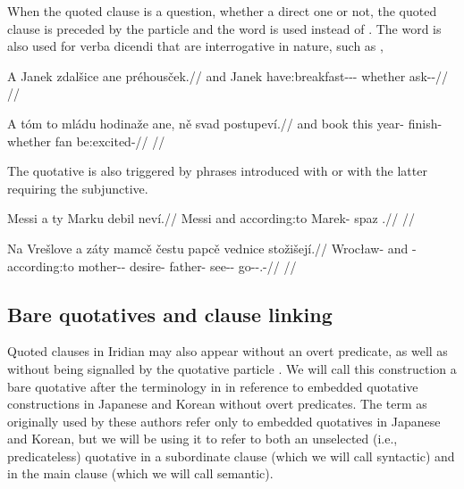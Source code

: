 When the quoted clause is a question, whether a direct one or not, the quoted
clause is preceded by the particle  and the word
 is used instead of . The word  is also
used for verba dicendi that are interrogative in nature, such as
,

\pex
\begingl
  \gla A Janek zdalšice ane préhousček.//
  \glb and Janek have:breakfast-\Av{}-\Pf{}-\Quot{} whether ask-\Av{}-\Pf{}//
  \glft {}//
\endgl
\xe

\pex
\begingl
  \gla A tóm to mládu hodinaže ane, ně svad postupeví.//
  \glb and book this year-\Ins{} finish- whether \Pl{} fan be:excited-\Cont{}//
  \glft {}//
\endgl
\xe

The quotative is also triggered by phrases introduced with  or  with the latter requiring the subjunctive. 

\pex
\begingl
  \gla Messi a ty Marku debil neví.//
  \glb Messi and according:to Marek-\Ins{} spaz \Cop{}.\Sbj{}//
  \glft {}//
\endgl
\xe

\pex
\begingl
  \gla Na Vrešlove a záty mamcě čestu papcě vednice stožišejí.//
  \glb \Loc{} Wrocław-\Acc{} and \Neg{}-according:to mother-\Dim{}-\Gen{} desire-\Ins{} father-\Gen{} see-\Pv{}-\SupP{} go-\Av{}-\Subj{}.\Pf{}-\Quot{}//
  \glft {}//
\endgl
\xe


\subsection{Bare quotatives and clause linking}

Quoted clauses in Iridian may also appear without an overt predicate, as well as
without being signalled by the quotative particle . We will call this
construction a {\sc bare quotative} after the terminology in
\textcite{tomioka2019} in reference to embedded quotative constructions in
Japanese and Korean without overt predicates. The term as originally used by
these authors refer only to embedded quotatives in Japanese and Korean, but we
will be using it to refer to both an unselected (i.e., predicateless) quotative
in a subordinate clause (which we will call {\sc syntactic}) and in the main
clause (which we will call {\sc semantic}).


